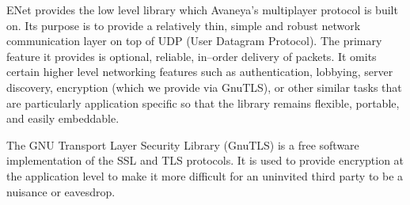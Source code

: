 

\startitemize[4]

ENet provides the low level library which Avaneya's multiplayer protocol is built on. Its purpose is to provide a relatively thin, simple and robust network communication layer on top of UDP (User Datagram Protocol). The primary feature it provides is optional, reliable, in--order delivery of packets. It omits certain higher level networking features such as authentication, lobbying, server discovery, encryption (which we provide via GnuTLS), or other similar tasks that are particularly application specific so that the library remains flexible, portable, and easily embeddable.


The GNU Transport Layer Security Library (GnuTLS) is a free software implementation of the SSL and TLS protocols. It is used to provide encryption at the application level to make it more difficult for an uninvited third party to be a nuisance or eavesdrop.
\stopitemize

